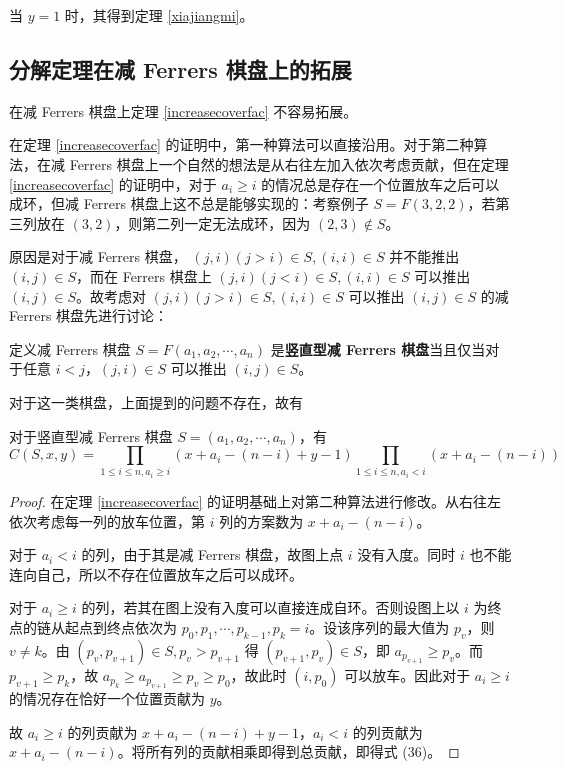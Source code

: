 \documentclass{noithesis}
\begin{document}
	当 $y=1$ 时，其得到定理 \ref{xiajiangmi}。
	
	\subsection{分解定理在减 Ferrers 棋盘上的拓展}
	
	在减 Ferrers 棋盘上定理 \ref{increasecoverfac} 不容易拓展。
	
	在定理 \ref{increasecoverfac} 的证明中，第一种算法可以直接沿用。对于第二种算法，在减 Ferrers 棋盘上一个自然的想法是从右往左加入依次考虑贡献，但在定理 \ref{increasecoverfac} 的证明中，对于 $a_i \geq i$ 的情况总是存在一个位置放车之后可以成环，但减 Ferrers 棋盘上这不总是能够实现的：考察例子 $S = F(3,2,2)$，若第三列放在 $(3,2)$，则第二列一定无法成环，因为 $(2,3) \not\in S$。
	
	原因是对于减 Ferrers 棋盘， $(j,i)(j>i) \in S,(i,i) \in S$ 并不能推出 $(i,j) \in S$，而在 Ferrers 棋盘上 $(j,i)(j<i) \in S,(i,i) \in S$ 可以推出 $(i,j) \in S$。故考虑对 $(j,i)(j>i) \in S,(i,i) \in S$ 可以推出 $(i,j) \in S$ 的减 Ferrers 棋盘先进行讨论：
	\begin{definition}
		定义减 Ferrers 棋盘 $S = F(a_1,a_2,\cdots,a_n)$ 是\textbf{竖直型减 Ferrers 棋盘}当且仅当对于任意 $i<j$，$(j,i) \in S$ 可以推出 $(i,j) \in S$。
	\end{definition}

	对于这一类棋盘，上面提到的问题不存在，故有
	\begin{theorem}\label{uprightcoverfac}
		对于竖直型减 Ferrers 棋盘 $S = (a_1,a_2,\cdots,a_n)$，有
		\begin{equation}
		C(S,x,y) = \prod_{1 \leq i \leq n , a_i \geq i} (x+ a_i - (n-i) + y - 1) \prod_{1 \leq i \leq n , a_i < i} (x + a_i - (n-i))
		\end{equation}
	\end{theorem}
	\begin{proof}
		在定理 \ref{increasecoverfac} 的证明基础上对第二种算法进行修改。从右往左依次考虑每一列的放车位置，第 $i$ 列的方案数为 $x+a_i-(n-i)$。
		
		对于 $a_i < i$ 的列，由于其是减 Ferrers 棋盘，故图上点 $i$ 没有入度。同时 $i$ 也不能连向自己，所以不存在位置放车之后可以成环。
		
		对于 $a_i \geq i$ 的列，若其在图上没有入度可以直接连成自环。否则设图上以 $i$ 为终点的链从起点到终点依次为 $p_0,p_1,\cdots,p_{k-1},p_k=i$。设该序列的最大值为 $p_v$，则 $v \neq k$。由 $(p_v,p_{v+1}) \in S,p_v > p_{v+1}$ 得 $(p_{v+1},p_v) \in S$，即 $a_{p_{v+1}} \geq p_v$。而 $p_{v+1} \geq p_k$，故 $a_{p_k} \geq a_{p_{v+1}} \geq p_v \geq p_0$，故此时 $(i,p_0)$ 可以放车。因此对于 $a_i \geq i$ 的情况存在恰好一个位置贡献为 $y$。
		
		故 $a_i \geq i$ 的列贡献为 $x+a_i-(n-i)+y-1$，$a_i < i$ 的列贡献为 $x+a_i-(n-i)$。将所有列的贡献相乘即得到总贡献，即得式 (36)。
	\end{proof}
	
\end{document}
